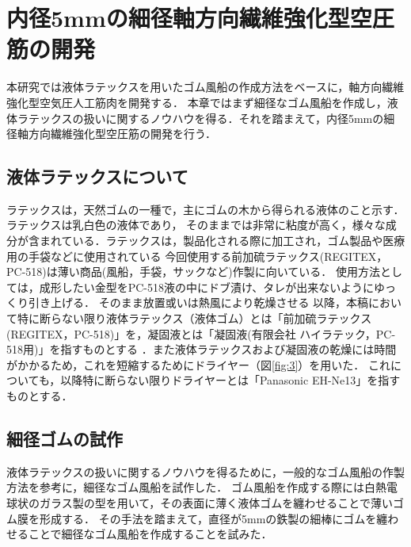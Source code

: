 \newpage
\section{内径5mmの細径軸方向繊維強化型空圧筋の開発}
本研究では液体ラテックスを用いたゴム風船の作成方法をベースに，軸方向繊維強化型空気圧人工筋肉を開発する．
本章ではまず細径なゴム風船を作成し，液体ラテックスの扱いに関するノウハウを得る．それを踏まえて，内径5mmの細径軸方向繊維強化型空圧筋の開発を行う．
\subsection{液体ラテックスについて}
ラテックスは，天然ゴムの一種で，主にゴムの木から得られる液体のこと示す．ラテックスは乳白色の液体であり，
そのままでは非常に粘度が高く，様々な成分が含まれている．ラテックスは，製品化される際に加工され，ゴム製品や医療用の手袋などに使用されている
今回使用する前加硫ラテックス(REGITEX，PC-518)は薄い商品(風船，手袋，サックなど)作製に向いている．
使用方法としては，成形したい金型をPC-518液の中にドブ漬け、タレが出来ないようにゆっくり引き上げる．
そのまま放置或いは熱風により乾燥させる
以降，本稿において特に断らない限り液体ラテックス（液体ゴム）とは「前加硫ラテックス(REGITEX，PC-518)」を，凝固液とは「凝固液(有限会社 ハイラテック，PC-518用)」を指すものとする
．また液体ラテックスおよび凝固液の乾燥には時間がかかるため，これを短縮するためにドライヤー（図\ref{fig:3}）を用いた．
これについても，以降特に断らない限りドライヤーとは「Panasonic EH-Ne13」を指すものとする．
\subsection{細径ゴムの試作}
液体ラテックスの扱いに関するノウハウを得るために，一般的なゴム風船の作製方法\cite{6}を参考に，細径なゴム風船を試作した．
ゴム風船を作成する際には白熱電球状のガラス製の型を用いて，その表面に薄く液体ゴムを纏わせることで薄いゴム膜を形成する．
その手法を踏まえて，直径が5mmの鉄製の細棒にゴムを纏わせることで細径なゴム風船を作成することを試みた．

